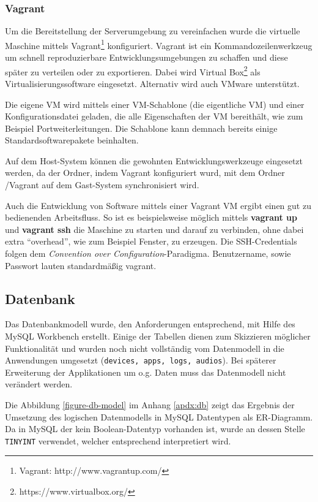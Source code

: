\subsubsection{Vagrant \label{sec:Vagrant}}
\label{vagrant}
Um die Bereitstellung der Serverumgebung zu vereinfachen wurde die virtuelle Maschine mittels Vagrant\footnote{Vagrant: http://www.vagrantup.com/} konfiguriert. 
Vagrant ist ein Kommandozeilenwerkzeug um schnell reproduzierbare Entwicklungsumgebungen zu schaffen und diese später zu verteilen oder zu exportieren. 
Dabei wird Virtual Box\footnote{https://www.virtualbox.org/} als Virtualisierungssoftware eingesetzt. 
Alternativ wird auch VMware unterstützt. 

Die eigene \ac{VM} wird mittels einer VM-Schablone (die eigentliche VM) und einer Konfigurationsdatei geladen, die alle Eigenschaften der VM bereithält, wie zum Beispiel Portweiterleitungen. 
Die Schablone kann demnach bereits einige Standardsoftwarepakete beinhalten. 

Auf dem Host-System können die gewohnten Entwicklungswerkzeuge eingesetzt werden, da der Ordner, indem Vagrant konfiguriert wurd, mit dem Ordner /Vagrant auf dem Gast-System synchronisiert wird. 

Auch die Entwicklung von Software mittels einer Vagrant VM ergibt einen gut zu bedienenden Arbeitsfluss. 
So ist es beispielsweise möglich mittels \textbf{vagrant up} und \textbf{vagrant ssh} die Maschine zu starten und darauf zu verbinden, ohne dabei extra \enquote{overhead}, wie zum Beispiel Fenster, zu erzeugen. 
Die SSH-Credentials folgen dem \textit{Convention over Configuration}-Paradigma. 
Benutzername, sowie Passwort lauten standardmäßig vagrant. 

\subsection{Datenbank}

Das Datenbankmodell wurde, den Anforderungen entsprechend, mit Hilfe des MySQL Workbench erstellt.
Einige der Tabellen dienen zum Skizzieren möglicher Funktionalität und wurden noch nicht vollständig vom Datenmodell in die Anwendungen umgesetzt (\texttt{devices, apps, logs, audios}).
Bei späterer Erweiterung der Applikationen um o.g. Daten muss das Datenmodell nicht verändert werden.

Die Abbildung \ref{figure-db-model} im Anhang \ref{apdx:db} zeigt das Ergebnis der Umsetzung des logischen Datenmodells in MySQL Datentypen als \ac{ER}-Diagramm.
Da in MySQL der kein Boolean-Datentyp vorhanden ist, wurde an dessen Stelle \texttt{TINYINT} verwendet, welcher entsprechend interpretiert wird.

